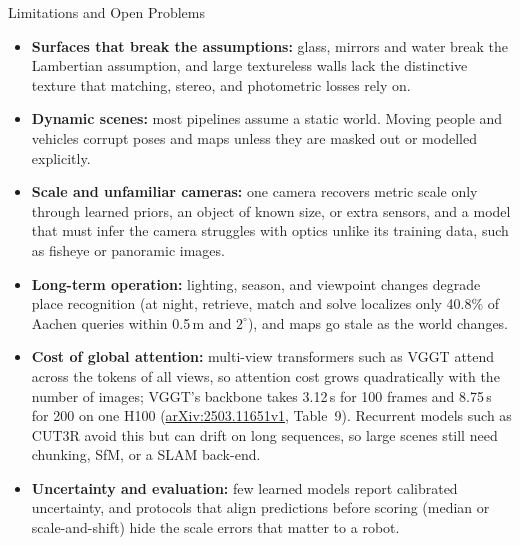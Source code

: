 \begin{frame}{Limitations and Open Problems}
  \begin{itemize}\footnotesize\itemsep0.1em
    \item \textbf{Surfaces that break the assumptions:} glass, mirrors and water break the Lambertian assumption, and large textureless walls lack the distinctive texture that matching, stereo, and photometric losses rely on.
    \item \textbf{Dynamic scenes:} most pipelines assume a static world. Moving people and vehicles corrupt poses and maps unless they are masked out or modelled explicitly.
    \item \textbf{Scale and unfamiliar cameras:} one camera recovers metric scale only through learned priors, an object of known size, or extra sensors, and a model that must infer the camera struggles with optics unlike its training data, such as fisheye or panoramic images.
    \item \textbf{Long-term operation:} lighting, season, and viewpoint changes degrade place recognition (at night, retrieve, match and solve localizes only 40.8\% of Aachen queries within 0.5\,m and $2^\circ$), and maps go stale as the world changes.
    \item \textbf{Cost of global attention:} multi-view transformers such as VGGT attend across the tokens of all views, so attention cost grows quadratically with the number of images; VGGT's backbone takes 3.12\,s for 100 frames and 8.75\,s for 200 on one H100 (\href{https://arxiv.org/abs/2503.11651v1}{arXiv:2503.11651v1}, Table~9). Recurrent models such as CUT3R avoid this but can drift on long sequences, so large scenes still need chunking, SfM, or a SLAM back-end.
    \item \textbf{Uncertainty and evaluation:} few learned models report calibrated uncertainty, and protocols that align predictions before scoring (median or scale-and-shift) hide the scale errors that matter to a robot.
  \end{itemize}
\end{frame}
